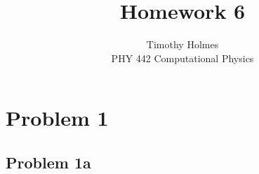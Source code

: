 \documentclass[12pt]{article}
\begin{document}
 
 
\title{Homework 6}
\author{Timothy Holmes\\ %
PHY 442 Computational Physics}

\maketitle

\section*{Problem 1}

\subsection*{Problem 1a}
\end{document}
